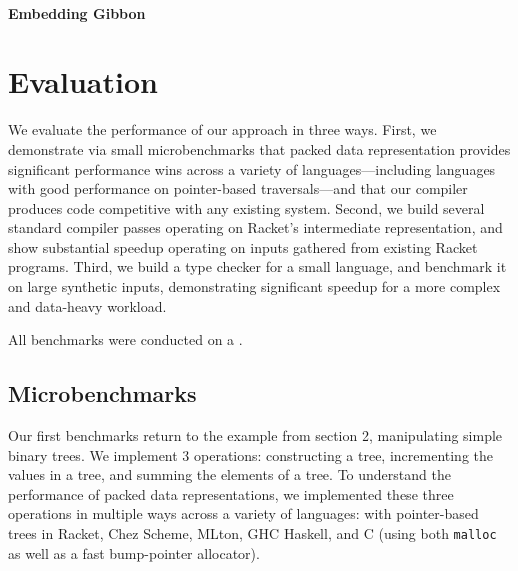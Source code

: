 \documentclass[a4paper,english]{lipics-v2016}
\begin{document}


\paragraph*{Embedding Gibbon}




\section{Evaluation}

We evaluate the performance of our approach in three ways. First, we
demonstrate via small microbenchmarks that packed data representation
provides significant performance wins across a variety of
languages---including languages with good performance on pointer-based
traversals---and that our compiler produces code competitive with any
existing system. Second, we build several standard compiler passes
operating on Racket's intermediate representation, and show
substantial speedup operating on inputs gathered from existing Racket
programs. Third, we build a type checker for a small language, and
benchmark it on large synthetic inputs, demonstrating significant
speedup for a more complex and data-heavy workload. 

All benchmarks were conducted on a .

\subsection{Microbenchmarks}

Our first benchmarks return to the example from section 2,
manipulating simple binary trees. We implement 3 operations:
constructing a tree, incrementing the values in a tree, and summing
the elements of a tree. To understand the performance of packed data
representations, we implemented these three operations in multiple
ways across a variety of languages: with pointer-based trees in
Racket, Chez Scheme, MLton, GHC Haskell, and C (using both \texttt{malloc} as well
as a fast bump-pointer allocator).
\end{document}

